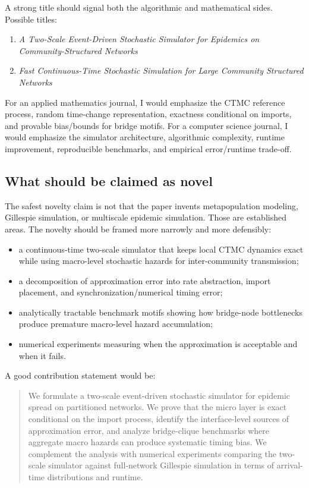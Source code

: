 \documentclass[12pt,a4paper]{article}
\theoremstyle{definition}
\newcommand{\1}{\mathbf{1}}
\begin{document}
A strong title should signal both the algorithmic and mathematical sides.  Possible titles:
\begin{enumerate}
    \item \emph{A Two-Scale Event-Driven Stochastic Simulator for Epidemics on Community-Structured Networks}
    \item \emph{Fast Continuous-Time Stochastic Simulation for Large Community Structured Networks}
\end{enumerate}

For an applied mathematics journal, I would emphasize the CTMC reference process, random time-change representation, exactness conditional on imports, and provable bias/bounds for bridge motifs.  For a computer science journal, I would emphasize the simulator architecture, algorithmic complexity, runtime improvement, reproducible benchmarks, and empirical error/runtime trade-off.

\subsection{What should be claimed as novel}

The safest novelty claim is not that the paper invents metapopulation modeling, Gillespie simulation, or multiscale epidemic simulation.  Those are established areas.  The novelty should be framed more narrowly and more defensibly:
\begin{itemize}
    \item a continuous-time two-scale simulator that keeps local CTMC dynamics exact while using macro-level stochastic hazards for inter-community transmission;
    \item a decomposition of approximation error into rate abstraction, import placement, and synchronization/numerical timing error;
    \item analytically tractable benchmark motifs showing how bridge-node bottlenecks produce premature macro-level hazard accumulation;
    \item numerical experiments measuring when the approximation is acceptable and when it fails.
\end{itemize}

A good contribution statement would be:
\begin{quote}
We formulate a two-scale event-driven stochastic simulator for epidemic spread on partitioned networks.  We prove that the micro layer is exact conditional on the import process, identify the interface-level sources of approximation error, and analyze bridge-clique benchmarks where aggregate macro hazards can produce systematic timing bias.  We complement the analysis with numerical experiments comparing the two-scale simulator against full-network Gillespie simulation in terms of arrival-time distributions and runtime.
\end{quote}
\end{document}
